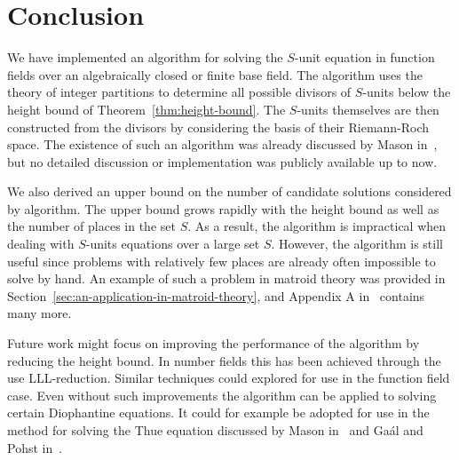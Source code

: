 
\chapter{Conclusion}%
\label{chap:conclusion}

We have implemented an algorithm for solving the \(S\)-unit equation in function fields over an algebraically closed or finite base field. The algorithm uses the theory of integer partitions to determine all possible divisors of \(S\)-units below the height bound of Theorem~\ref{thm:height-bound}. The \(S\)-units themselves are then constructed from the divisors by considering the basis of their Riemann-Roch space. The existence of such an algorithm was already discussed by Mason in~\cite{mason-1984-diophantine-equations-over}, but no detailed discussion or implementation was publicly available up to now.

We also derived an upper bound on the number of candidate solutions considered by algorithm. The upper bound grows rapidly with the height bound as well as the number of places in the set \(S\). As a result, the algorithm is impractical when dealing with \(S\)-units equations over a large set \(S\). However, the algorithm is still useful since problems with relatively few places are already often impossible to solve by hand. An example of such a problem in matroid theory was provided in Section~\ref{sec:an-application-in-matroid-theory}, and Appendix A in~\cite{baker-2023-foundations-of-matroids} contains many more.

Future work might focus on improving the performance of the algorithm by reducing the height bound. In number fields this has been achieved through the use LLL-reduction. Similar techniques could explored for use in the function field case. Even without such improvements the algorithm can be applied to solving certain Diophantine equations. It could for example be adopted for use in the method for solving the Thue equation discussed by Mason in~\cite{mason-1984-diophantine-equations-over} and Ga\'{a}l and Pohst in~\cite{gaal-2006-diophantine-equations-over, gaal-2006-diophantine-equations-overa}.
